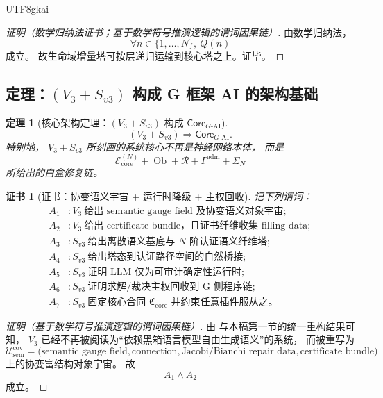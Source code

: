 \documentclass[12pt]{article}
\newtheorem{theorem}{定理}[section]
\newtheorem{Certificate}{证书}[section]
\newcommand{\Ob}{\operatorname{Ob}}
\begin{document}
\begin{CJK*}{UTF8}{gkai}
\begin{proof}[证明（数学归纳法证书；基于数学符号推演逻辑的谓词因果链）]
由数学归纳法，
\[
  \forall n\in\{1,\dots,N\},\ Q(n)
\]
成立。
故生命域增量塔可按层递归运输到核心塔之上。证毕。
\end{proof}

\subsection{定理：\texorpdfstring{$(V_3+S_{v3})$}{(V3+S-v3)} 构成 G 框架 AI 的架构基础}
\label{subsec:tex39-ch3-theorem-core}

\begin{theorem}[核心架构定理：\texorpdfstring{$(V_3+S_{v3})$}{(V3+S-v3)} 构成 \texorpdfstring{$\mathsf{Core}_{G\text{-AI}}$}
  {Core-G-AI}]
\label{thm:tex39-ch3-core}
\[
  (V_3+S_{v3})
  \Longrightarrow
  \mathsf{Core}_{G\text{-AI}}.
\]
特别地，
$V_3+S_{v3}$ 所刻画的系统核心不再是神经网络本体，
而是
\[
  \mathcal E_{\mathrm{core}}^{(N)}
  +\Ob+\mathcal R+\Gamma^{\mathrm{adm}}+\Sigma_N
\]
所给出的白盒修复链。
\end{theorem}

\begin{Certificate}[证书：协变语义宇宙 + 运行时降级 + 主权回收]
\label{cert:tex39-ch3-core}
记下列谓词：
\[
\begin{aligned}
  A_1 &: V_3\ \text{给出 semantic gauge field 及协变语义对象宇宙};\\
  A_2 &: V_3\ \text{给出 certificate bundle，且证书纤维收集 filling data};\\
  A_3 &: S_{v3}\ \text{给出离散语义基底与 }N\text{ 阶认证语义纤维塔};\\
  A_4 &: S_{v3}\ \text{给出塔态到认证路径空间的自然桥接};\\
  A_5 &: S_{v3}\ \text{证明 LLM 仅为可审计确定性运行时};\\
  A_6 &: S_{v3}\ \text{证明求解/裁决主权回收到 G 侧程序链};\\
  A_7 &: S_{v3}\ \text{固定核心合同 }\mathfrak C_{\mathrm{core}}
  \text{ 并约束任意插件服从之。}
\end{aligned}
\]
\end{Certificate}

\begin{proof}[证明（基于数学符号推演逻辑的谓词因果链）]
由
\cite{RepoTex37SemanticGaugeRuntime}
与本稿第一节的统一重构结果可知，
$V_3$ 已经不再被阅读为“依赖黑箱语言模型自由生成语义”的系统，
而被重写为
\[
  \mathcal U_{\mathrm{sem}}^{\mathrm{cov}}
  =
  \bigl(
    \text{semantic gauge field},
    \text{connection},
    \text{Jacobi/Bianchi repair data},
    \text{certificate bundle}
  \bigr)
\]
上的协变富结构对象宇宙。
故
\[
  A_1\wedge A_2
\]
成立。


\end{proof}
\end{CJK*}
\end{document}
